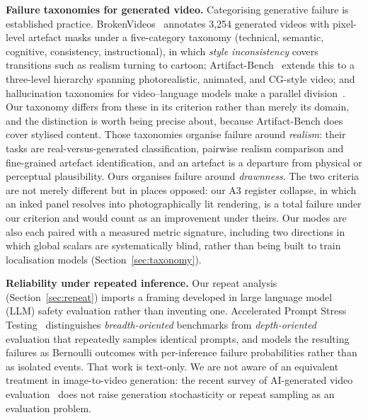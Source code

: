 \documentclass[11pt]{article}
\begin{document}
\textbf{Failure taxonomies for generated video.} Categorising generative
failure is established practice.
BrokenVideos~\cite{lin2025brokenvideos} annotates 3{,}254
generated videos with pixel-level artefact masks under a five-category
taxonomy (technical, semantic, cognitive, consistency, instructional), in
which \emph{style inconsistency} covers transitions such as realism turning
to cartoon; Artifact-Bench~\cite{tang2026artifactbench} extends this to a
three-level hierarchy spanning photorealistic, animated, and CG-style video;
and hallucination taxonomies for video--language models make a parallel
division~\cite{huang2026distorted}. Our taxonomy differs from these in its
criterion rather than merely its domain, and the distinction is worth being
precise about, because Artifact-Bench does cover stylised content. Those
taxonomies organise failure around \emph{realism}: their tasks are
real-versus-generated classification, pairwise realism comparison and
fine-grained artefact identification, and an
artefact is a departure from physical or perceptual plausibility. Ours
organises failure around \emph{drawnness}. The two criteria are not merely
different but in places opposed: our A3 register collapse, in which an
inked panel resolves into photographically lit rendering, is a total failure
under our criterion and would count as an improvement under theirs. Our
modes are also each paired with a measured metric signature, including two
directions in which global scalars are systematically blind, rather than
being built to train localisation models (Section~\ref{sec:taxonomy}).

\textbf{Reliability under repeated inference.} Our repeat analysis
(Section~\ref{sec:repeat}) imports a framing developed in large language model (LLM) safety
evaluation rather than inventing one. Accelerated Prompt Stress
Testing~\cite{broadwater2026apst,broadwater2026reliability}
distinguishes \emph{breadth-oriented} benchmarks from \emph{depth-oriented}
evaluation that repeatedly samples identical prompts, and models the
resulting failures as Bernoulli outcomes with per-inference failure
probabilities rather than as isolated events. That work is
text-only. We are not aware of an equivalent treatment in image-to-video
generation: the recent survey of AI-generated video
evaluation~\cite{liu2024survey} does not raise generation stochasticity or
repeat sampling as an evaluation problem.
\end{document}

